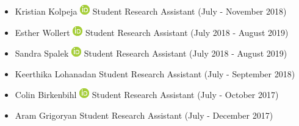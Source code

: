 \documentclass[10pt,a4paper,sans]{moderncv} %
\begin{document}
\begin{itemize}
        \item     Kristian Kolpeja {\scriptsize     \href{https://orcid.org/0000-0001-9661-5277}{\includegraphics[scale=0.5]{img/ORCIDiD_icon16x16}}
}    Student Research Assistant (July - November 2018)

        \item     Esther Wollert {\scriptsize     \href{https://orcid.org/0000-0002-7128-929X}{\includegraphics[scale=0.5]{img/ORCIDiD_icon16x16}}
}    Student Research Assistant (July 2018 - August 2019)

        \item     Sandra Spalek {\scriptsize     \href{https://orcid.org/0000-0002-6117-4413}{\includegraphics[scale=0.5]{img/ORCIDiD_icon16x16}}
}    Student Research Assistant (July 2018 - August 2019)

        \item     Keerthika Lohanadan     Student Research Assistant (July - September 2018)

        \item     Colin Birkenbihl {\scriptsize     \href{https://orcid.org/0000-0002-7212-7700}{\includegraphics[scale=0.5]{img/ORCIDiD_icon16x16}}
}    Student Research Assistant (July - October 2017)

        \item     Aram Grigoryan     Student Research Assistant (July - December 2017)

        \end{itemize}
\end{document}

